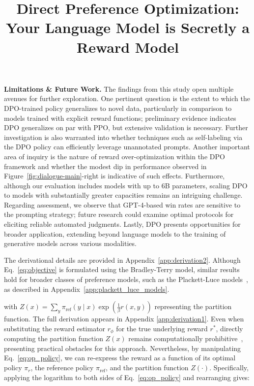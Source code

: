 \title{Direct Preference Optimization: Your Language Model is Secretly a Reward Model}
\textbf{Limitations \& Future Work.} The findings from this study open multiple avenues for further exploration. One pertinent question is the extent to which the DPO-trained policy generalizes to novel data, particularly in comparison to models trained with explicit reward functions; preliminary evidence indicates DPO generalizes on par with PPO, but extensive validation is necessary. Further investigation is also warranted into whether techniques such as self-labeling via the DPO policy can efficiently leverage unannotated prompts. Another important area of inquiry is the nature of reward over-optimization within the DPO framework and whether the modest dip in performance observed in Figure~\ref{fig:dialogue-main}-right is indicative of such effects. Furthermore, although our evaluation includes models with up to 6B parameters, scaling DPO to models with substantially greater capacities remains an intriguing challenge. Regarding assessment, we observe that GPT-4-based win rates are sensitive to the prompting strategy; future research could examine optimal protocols for eliciting reliable automated judgments. Lastly, DPO presents opportunities for broader application, extending beyond language models to the training of generative models across various modalities.

The derivational details are provided in Appendix~\ref{app:derivation2}. Although Eq.~\ref{eq:objective} is formulated using the Bradley-Terry model, similar results hold for broader classes of preference models, such as the Plackett-Luce models~\citep{plackett1975analysis, luce2012individual}, as described in Appendix~\ref{app:plackett_luce_models}.

with $Z(x) =\sum_{y}\pi_\text{ref}(y\mid x)\exp\left(\frac{1}{\beta}r(x, y)\right)$ representing the partition function. The full derivation appears in Appendix \ref{app:derivation1}. Even when substituting the reward estimator $r_{\phi}$ for the true underlying reward $r^*$, directly computing the partition function $Z(x)$ remains computationally prohibitive~\citep{korbak2022reinforcement, go2023aligning}, presenting practical obstacles for this approach. Nevertheless, by manipulating Eq.~\ref{eq:op_policy}, we can re-express the reward as a function of its optimal policy $\pi_r$, the reference policy $\pi_\text{ref}$, and the partition function $Z(\cdot)$. Specifically, applying the logarithm to both sides of Eq.~\ref{eq:op_policy} and rearranging gives:

